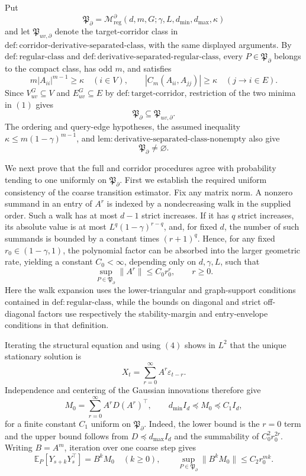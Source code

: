 Put
\[
 \mathfrak P_{\partial}
 =\mathcal M_{\mathrm{reg}}^{\partial}
 (d,m,G;\gamma,L,d_{\min},d_{\max},\kappa)
\]
and let \(\mathfrak P_{uv,\partial}\) denote the target-corridor class in
\(\mathrm{def{:}corridor\mbox{-}derivative\mbox{-}separated\mbox{-}class}\),
with the same displayed arguments.  By
\(\mathrm{def{:}regular\mbox{-}class}\) and
\(\mathrm{def{:}derivative\mbox{-}separated\mbox{-}regular\mbox{-}class}\),
every \(P\in\mathfrak P_{\partial}\) belongs to the compact class, has odd
\(m\), and satisfies
\[
 m|A_{ii}|^{m-1}\geq\kappa\quad(i\in V),
 \qquad
 |C_m(A_{ii},A_{jj})|\geq\kappa\quad(j\to i\in E).
 \tag{1}
\]
Since \(V_{uv}^{G}\subseteq V\) and \(E_{uv}^{G}\subseteq E\) by
\(\mathrm{def{:}target\mbox{-}corridor}\), restriction of the two minima
in \((1)\) gives
\[
 \mathfrak P_{\partial}\subseteq\mathfrak P_{uv,\partial}.
 \tag{2}
\]
The ordering and query-edge hypotheses, the assumed inequality
\(\kappa\leq m(1-\gamma)^{m-1}\), and
\(\mathrm{lem{:}derivative\mbox{-}separated\mbox{-}class\mbox{-}nonempty}\)
also give
\[
 \mathfrak P_{\partial}\neq\varnothing.
 \tag{3}
\]

We next prove that the full and corridor procedures agree with probability
tending to one uniformly on \(\mathfrak P_{\partial}\).  First we establish
the required uniform consistency of the coarse transition estimator.  Fix
any matrix norm.  A nonzero summand in an entry of \(A^r\) is indexed by a
nondecreasing walk in the supplied order.  Such a walk has at most
\(d-1\) strict increases.  If it has \(q\) strict increases, its absolute
value is at most \(L^q(1-\gamma)^{r-q}\), and, for fixed \(d\), the number
of such summands is bounded by a constant times \((r+1)^q\).  Hence, for
any fixed \(r_0\in(1-\gamma,1)\), the polynomial factor can be absorbed
into the larger geometric rate, yielding a constant \(C_0<\infty\),
depending only on \(d,\gamma,L\), such that
\[
 \sup_{P\in\mathfrak P_{\partial}}\|A^r\|
 \leq C_0r_0^r,
 \qquad r\geq0.
 \tag{4}
\]
Here the walk expansion uses the lower-triangular and graph-support
conditions contained in \(\mathrm{def{:}regular\mbox{-}class}\), while the
bounds on diagonal and strict off-diagonal factors use respectively the
stability-margin and entry-envelope conditions in that definition.

Iterating the structural equation and using \((4)\) shows in \(L^2\) that
the unique stationary solution is
\[
 X_t=\sum_{r=0}^{\infty}A^r\varepsilon_{t-r}.
\]
Independence and centering of the Gaussian innovations therefore give
\[
 M_0=\sum_{r=0}^{\infty}A^rD(A^r)^\top,
 \qquad
 d_{\min}I_d\preceq M_0\preceq C_1I_d,
 \tag{5}
\]
for a finite constant \(C_1\) uniform on \(\mathfrak P_{\partial}\).
Indeed, the lower bound is the \(r=0\) term and the upper bound follows
from \(D\preceq d_{\max}I_d\) and the summability of \(C_0^2r_0^{2r}\).
Writing \(B=A^m\), iteration over one coarse step gives
\[
 \mathbb E_P[Y_{s+k}Y_s^\top]=B^kM_0\quad(k\geq0),
 \qquad
 \sup_{P\in\mathfrak P_{\partial}}\|B^kM_0\|
 \leq C_2r_0^{mk}.
 \tag{6}
\]

